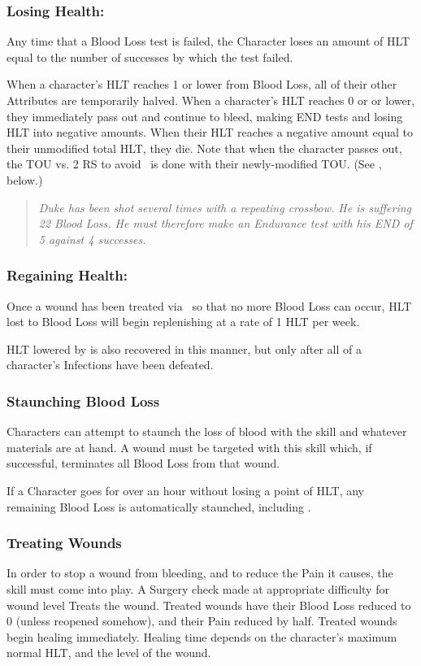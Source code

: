 \documentclass[oneside,11pt,english]{book}
\begin{document}
\subsubsection{Losing Health:}
Any time that a Blood Loss test is failed, the Character loses an amount of HLT equal to the number of 
successes by which the test failed.

When a character's HLT reaches 1 or lower from Blood Loss, all of their other Attributes are temporarily halved. When a character’s HLT reaches 0 or or lower, they immediately pass out and continue to bleed, making END tests and losing HLT into negative amounts. When their HLT reaches a negative amount equal to their unmodified total HLT, they die. Note that when the character passes out, the TOU vs. 2 RS to avoid ~is done with their newly-modified TOU. (See , below.)

\begin{quote}
	\emph{Duke has been shot several times with a repeating crossbow. He is suffering 22 Blood Loss. He must therefore make an Endurance test with his END of 5 against 4 successes.}
\end{quote}
\subsubsection{Regaining Health:}
Once a wound has been treated via ~so that no more Blood Loss can occur, HLT lost to Blood Loss will begin replenishing at a rate of 1 HLT per week.

HLT lowered by  is also recovered in this manner, but only after all of a character’s Infections have been defeated.

\subsubsection{Staunching Blood Loss}
Characters can attempt to staunch the loss of blood with the  skill and whatever materials are at hand. A wound must be targeted with this skill which, if successful, terminates all Blood Loss from that wound.

If a Character goes for over an hour without losing a point of HLT, any remaining Blood Loss is automatically staunched, including .

\subsubsection{Treating Wounds}
In order to stop a wound from bleeding, and to reduce the Pain it causes, the  skill must come into 
play. A Surgery check made at appropriate difficulty for wound level Treats the wound. Treated wounds 
have their Blood Loss reduced to 0 (unless reopened somehow), and their Pain reduced by half. Treated 
wounds begin healing immediately. Healing time depends on the character’s maximum normal HLT, and 
the level of the wound. 
\end{document}
